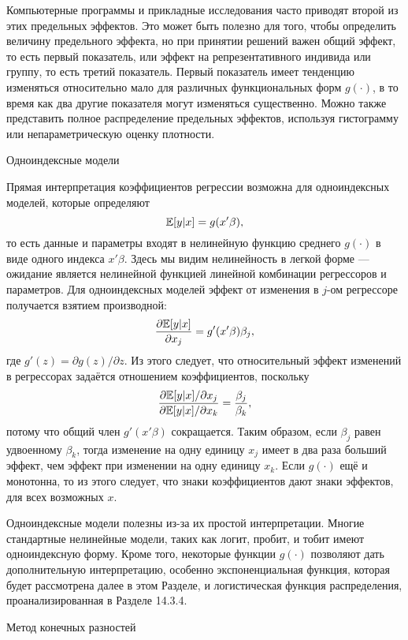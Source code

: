 Компьютерные программы и прикладные исследования часто приводят второй из этих предельных эффектов. Это может быть полезно для того, чтобы определить величину предельного эффекта, но при принятии решений важен общий эффект, то есть первый показатель, или эффект на репрезентативного индивида или группу, то есть третий показатель. Первый показатель имеет тенденцию изменяться относительно мало для различных функциональных форм $g(\cdot)$, в то время как два другие показателя могут изменяться существенно. Можно также представить полное распределение предельных эффектов, используя гистограмму или непараметрическую оценку плотности.

\begin{center}
Одноиндексные модели
\end{center}

Прямая интерпретация коэффициентов регрессии возможна для одноиндексных моделей, которые определяют
\begin{equation}
\mathbb{E}[y|x]= g(x'\beta),
\end{equation}
то есть данные и параметры входят в нелинейную функцию среднего $g(\cdot)$ в виде одного индекса $x'\beta$. Здесь мы видим нелинейность в легкой форме --- ожидание является нелинейной функцией линейной комбинации регрессоров и параметров. Для одноиндексных моделей эффект от изменения в $j$-ом регрессоре получается взятием производной:
\[
\frac{\partial \mathbb{E}[y|x]}{\partial x_j}=g'(x'\beta)\beta_j,
\]
где $g'(z)= \partial g(z)/\partial z$. Из этого следует, что относительный эффект изменений в регрессорах задаётся отношением коэффициентов, поскольку
\[
\frac{\partial \mathbb{E}[y|x] / \partial x_j}{\partial \mathbb{E}[y|x] / \partial x_k}=\frac{\beta_j}{\beta_k},
\]
потому что общий член $g'(x'\beta)$ сокращается. Таким образом, если $\beta_j$ равен удвоенному $\beta_k$, тогда изменение на одну единицу $x_j$ имеет в два раза больший эффект, чем эффект при изменении на одну единицу $x_k$. Если $g(\cdot)$ ещё и монотонна, то из этого следует, что знаки коэффициентов дают знаки эффектов, для всех возможных $x$.

Одноиндексные модели полезны из-за их простой интерпретации. Многие стандартные нелинейные модели, таких как логит, пробит, и тобит имеют одноиндексную форму. Кроме того, некоторые функции $g(\cdot)$ позволяют дать дополнительную интерпретацию, особенно экспоненциальная функция, которая будет рассмотрена далее в этом Разделе, и логистическая функция распределения, проанализированная в Разделе 14.3.4.

\begin{center}
Метод конечных разностей
\end{center}

